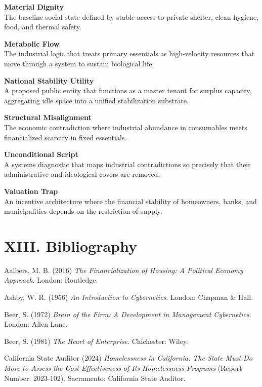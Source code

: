 \documentclass[
  12pt,
]{article}
\begin{document}
\textbf{Material Dignity}\\
The baseline social state defined by stable access to private shelter, clean hygiene, food, and thermal safety.

\textbf{Metabolic Flow}\\
The industrial logic that treats primary essentials as high-velocity resources that move through a system to sustain biological life.

\textbf{National Stability Utility}\\
A proposed public entity that functions as a master tenant for surplus capacity, aggregating idle space into a unified stabilization substrate.

\textbf{Structural Misalignment}\\
The economic contradiction where industrial abundance in consumables meets financialized scarcity in fixed essentials.

\textbf{Unconditional Script}\\
A systems diagnostic that maps industrial contradictions so precisely that their administrative and ideological covers are removed.

\textbf{Valuation Trap}\\
An incentive architecture where the financial stability of homeowners, banks, and municipalities depends on the restriction of supply.

\newpage\renewcommand{\baselinestretch}{0.95}\normalsize

\hypertarget{xiii.-bibliography}{%
\section{XIII. Bibliography}\label{xiii.-bibliography}}

Aalbers, M. B. (2016) \emph{The Financialization of Housing: A Political Economy Approach}. London: Routledge.

Ashby, W. R. (1956) \emph{An Introduction to Cybernetics}. London: Chapman \& Hall.

Beer, S. (1972) \emph{Brain of the Firm: A Development in Management Cybernetics}. London: Allen Lane.

Beer, S. (1981) \emph{The Heart of Enterprise}. Chichester: Wiley.

California State Auditor (2024) \emph{Homelessness in California: The State Must Do More to Assess the Cost-Effectiveness of Its Homelessness Programs} (Report Number: 2023-102). Sacramento: California State Auditor.
\end{document}
